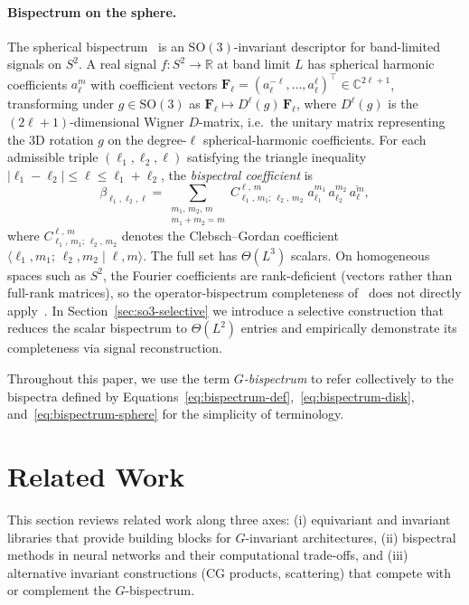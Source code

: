 \documentclass{article}
\theoremstyle{definition}
\theoremstyle{remark}
\newcommand{\R}{\mathbb{R}}
\newcommand{\C}{\mathbb{C}}
\newcommand{\SO}{\mathrm{SO}}
\newcommand{\CG}[6]{C^{#5,\,#6}_{#1,\,#2;\,#3,\,#4}}
\newcommand{\conj}[1]{\overline{#1}}
\theoremstyle{definition}
\begin{document}
\paragraph{Bispectrum on the sphere.}
The spherical bispectrum~\citep{kakarala2012bispectrum} is an
$\SO(3)$-invariant descriptor for band-limited signals on $S^2$.
A real signal $f : S^2 \to \R$ at band limit $L$ has spherical harmonic
coefficients $a_\ell^m$ with coefficient vectors
$\mathbf{F}_\ell = (a_\ell^{-\ell},\ldots,a_\ell^{\ell})^\top
\in \C^{2\ell+1}$, transforming under $g\in\SO(3)$ as
$\mathbf{F}_\ell \mapsto D^\ell(g)\,\mathbf{F}_\ell$, where $D^\ell(g)$
is the $(2\ell{+}1)$-dimensional Wigner $D$-matrix, i.e.\ the unitary
matrix representing the 3D rotation $g$ on the degree-$\ell$
spherical-harmonic coefficients.
For each admissible triple $(\ell_1,\ell_2,\ell)$ satisfying the
triangle inequality
$|\ell_1 - \ell_2| \le \ell \le \ell_1 + \ell_2$, the
\emph{bispectral coefficient} is
\begin{equation}\label{eq:bispectrum-sphere}
  \beta_{\ell_1,\ell_2,\ell}
  = \sum_{\substack{m_1,\,m_2,\,m \\ m_1+m_2=m}}
    \CG{\ell_1}{m_1}{\ell_2}{m_2}{\ell}{m}\;
    a_{\ell_1}^{m_1}\,a_{\ell_2}^{m_2}\,\conj{a_\ell^m},
\end{equation}
where $\CG{\ell_1}{m_1}{\ell_2}{m_2}{\ell}{m}$ denotes the
Clebsch--Gordan coefficient
$\langle \ell_1, m_1;\, \ell_2, m_2 \mid \ell, m \rangle$.
The full set has $\Theta(L^3)$ scalars. On homogeneous spaces such as
$S^2$, the Fourier coefficients are rank-deficient (vectors rather than
full-rank matrices), so the operator-bispectrum completeness
of~\citet{kakarala2012bispectrum} does not directly
apply~\citep{kondor2007novel}. In Section~\ref{sec:so3-selective} we
introduce a selective construction that reduces the scalar bispectrum to
$\Theta(L^2)$ entries and empirically demonstrate its completeness via
signal reconstruction.

Throughout this paper, we use the term \emph{$G$-bispectrum} to refer
collectively to the bispectra defined by
Equations~\eqref{eq:bispectrum-def},~\eqref{eq:bispectrum-disk},
and~\eqref{eq:bispectrum-sphere} for the simplicity of terminology.




\section{Related Work}
\label{sec:related}
This section reviews related work along three axes: (i) equivariant and invariant libraries that provide building blocks for $G$-invariant architectures, (ii) bispectral methods in neural networks and their computational trade-offs, and (iii) alternative invariant constructions (CG products, scattering) that compete with or complement the $G$-bispectrum. 
\end{document}
